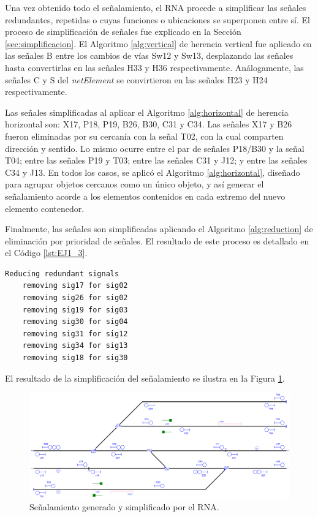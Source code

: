 	Una vez obtenido todo el señalamiento, el RNA procede a simplificar las señales redundantes, repetidas o cuyas funciones o ubicaciones se superponen entre sí. El proceso de simplificación de señales fue explicado en la Sección \ref{sec:simplificacion}. El Algoritmo \ref{alg:vertical} de herencia vertical fue aplicado en las señales B entre los cambios de vías Sw12 y Sw13, desplazando las señales hasta convertirlas en las señales H33 y H36 respectivamente. Análogamente, las señales C y S del \textit{netElement} se convirtieron en las señales H23 y H24 respectivamente.
	
	Las señales simplificadas al aplicar el Algoritmo \ref{alg:horizontal} de herencia horizontal son: X17, P18, P19, B26, B30, C31 y C34. Las señales X17 y B26 fueron eliminadas por su cercanía con la señal T02, con la cual comparten dirección y sentido. Lo mismo ocurre entre el par de señales P18/B30 y la señal T04; entre las señales P19 y T03; entre las señales C31 y J12; y entre las señales C34 y J13. En todos los casos, se aplicó el Algoritmo \ref{alg:horizontal}, diseñado para agrupar objetos cercanos como un único objeto, y así generar el señalamiento acorde a los elementos contenidos en cada extremo del nuevo elemento contenedor.
	
	Finalmente, las señales son simplificadas aplicando el Algoritmo \ref{alg:reduction} de eliminación por prioridad de señales. El resultado de este proceso es detallado en el Código \ref{lst:EJ1_3}.
	
	\begin{lstlisting}[language = {}, caption = Reducción de señalamiento por prioridad de señales, label = {lst:EJ1_3}]
	Reducing redundant signals
	removing sig17 for sig02
	removing sig26 for sig02
	removing sig19 for sig03
	removing sig30 for sig04
	removing sig31 for sig12
	removing sig34 for sig13
	removing sig18 for sig30
	\end{lstlisting}
	
	El resultado de la simplificación del señalamiento se ilustra en la Figura \ref{fig:EJ1_7}.
	
	\begin{figure}[H]
		\centering
		\includegraphics[width=1\textwidth]{resultados-obtenidos/ejemplo1/images/1_RNA.png}
		\centering\caption{Señalamiento generado y simplificado por el RNA.}
		\label{fig:EJ1_7}
	\end{figure}
	
